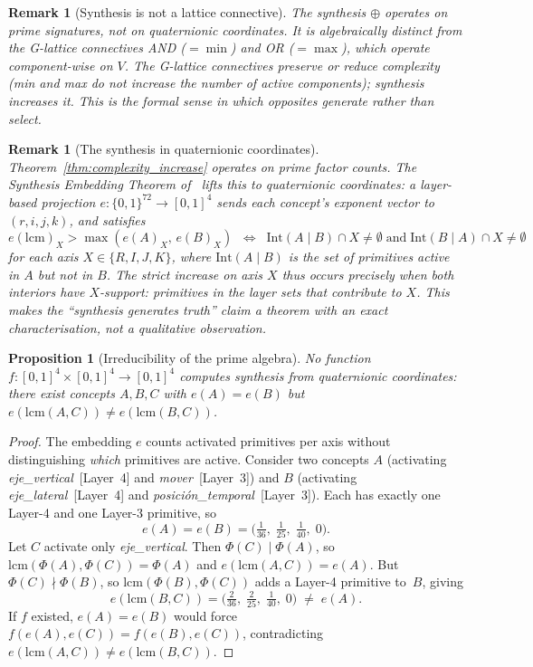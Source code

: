 \documentclass[11pt,a4paper]{article}
\newtheorem{proposition}[theorem]{Proposition}
\newtheorem{remark}[theorem]{Remark}
\begin{document}
\begin{remark}[Synthesis is not a lattice connective]
\label{rem:not_connective}
The synthesis $\oplus$ operates on prime signatures, not on
quaternionic coordinates. It is algebraically distinct from the
G-lattice connectives AND ($=\min$) and OR ($=\max$), which
operate component-wise on $V$. The G-lattice connectives preserve
or reduce complexity (min and max do not increase the number of
active components); synthesis \emph{increases} it. This is the
formal sense in which opposites \emph{generate} rather than
\emph{select}.
\end{remark}

\begin{remark}[The synthesis in quaternionic coordinates]
\label{rem:synth_coords}
Theorem~\ref{thm:complexity_increase} operates on prime factor
counts. The Synthesis Embedding Theorem of~\citet{p11} lifts this
to quaternionic coordinates: a layer-based projection
$e\colon\{0,1\}^{72}\to[0,1]^4$ sends each concept's exponent
vector to $(r,i,j,k)$, and satisfies
\[
  e(\mathrm{lcm})_X > \max(e(A)_X,\,e(B)_X)
  \;\;\Longleftrightarrow\;\;
  \mathrm{Int}(A\!\mid\! B)\cap X\neq\emptyset
  \;\text{and}\;
  \mathrm{Int}(B\!\mid\! A)\cap X\neq\emptyset
\]
for each axis $X\in\{R,I,J,K\}$, where
$\mathrm{Int}(A\!\mid\! B)$ is the set of primitives active in $A$
but not in $B$. The strict increase on axis $X$ thus occurs
precisely when both interiors have $X$-support: primitives in the
layer sets that contribute to $X$. This makes the ``synthesis
generates truth'' claim a theorem with an exact characterisation,
not a qualitative observation.
\end{remark}

\begin{proposition}[Irreducibility of the prime algebra]
\label{prop:irreducible}
No function $f\colon[0,1]^4\times[0,1]^4\to[0,1]^4$ computes
synthesis from quaternionic coordinates: there exist concepts
$A,B,C$ with $e(A)=e(B)$ but
$e(\mathrm{lcm}(A,C))\neq e(\mathrm{lcm}(B,C))$.
\end{proposition}

\begin{proof}
The embedding $e$ counts activated primitives per axis without
distinguishing \emph{which} primitives are active. Consider two
concepts $A$ (activating \emph{eje\_vertical}~[Layer~4] and
\emph{mover}~[Layer~3]) and $B$ (activating
\emph{eje\_lateral}~[Layer~4] and
\emph{posici\'on\_temporal}~[Layer~3]). Each has exactly one
Layer-4 and one Layer-3 primitive, so
\[
  e(A) = e(B) = \bigl(\tfrac{1}{36},\;\tfrac{1}{25},\;
  \tfrac{1}{40},\;0\bigr).
\]
Let $C$ activate only \emph{eje\_vertical}. Then
$\Phi(C)\mid\Phi(A)$, so $\mathrm{lcm}(\Phi(A),\Phi(C))=\Phi(A)$
and $e(\mathrm{lcm}(A,C))=e(A)$. But
$\Phi(C)\nmid\Phi(B)$, so $\mathrm{lcm}(\Phi(B),\Phi(C))$ adds
a Layer-4 primitive to~$B$, giving
\[
  e(\mathrm{lcm}(B,C)) = \bigl(\tfrac{2}{36},\;\tfrac{2}{25},\;
  \tfrac{1}{40},\;0\bigr) \;\neq\; e(A).
\]
If $f$ existed, $e(A)=e(B)$ would force
$f(e(A),e(C))=f(e(B),e(C))$, contradicting
$e(\mathrm{lcm}(A,C))\neq e(\mathrm{lcm}(B,C))$.
\end{proof}
\end{document}
